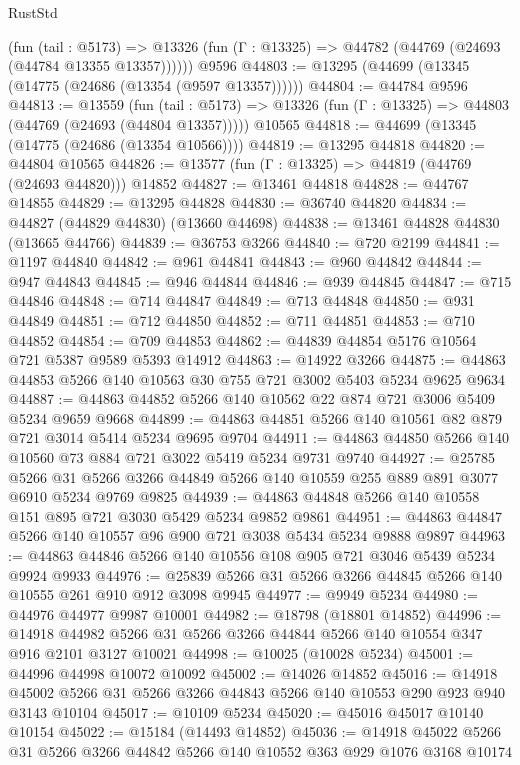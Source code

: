 \begin{lexlean}{RustStd}
\begin{coremodule}
      (fun (tail : @5173) =>
      @13326 (fun (Γ : @13325) => @44782 (@44769 (@24693 (@44784 @13355 @13357))))))
    @9596
@44803 := @13295 (@44699 (@13345 (@14775 (@24686 (@13354 (@9597 @13357))))))
@44804 := @44784 @9596
@44813 := @13559
    (fun (tail : @5173) => @13326 (fun (Γ : @13325) => @44803 (@44769 (@24693 (@44804 @13357)))))
    @10565
@44818 := @44699 (@13345 (@14775 (@24686 (@13354 @10566))))
@44819 := @13295 @44818
@44820 := @44804 @10565
@44826 := @13577 (fun (Γ : @13325) => @44819 (@44769 (@24693 @44820))) @14852
@44827 := @13461 @44818
@44828 := @44767 @14855
@44829 := @13295 @44828
@44830 := @36740 @44820
@44834 := @44827 (@44829 @44830) (@13660 @44698)
@44838 := @13461 @44828 @44830 (@13665 @44766)
@44839 := @36753 @3266
@44840 := @720 @2199
@44841 := @1197 @44840
@44842 := @961 @44841
@44843 := @960 @44842
@44844 := @947 @44843
@44845 := @946 @44844
@44846 := @939 @44845
@44847 := @715 @44846
@44848 := @714 @44847
@44849 := @713 @44848
@44850 := @931 @44849
@44851 := @712 @44850
@44852 := @711 @44851
@44853 := @710 @44852
@44854 := @709 @44853
@44862 := @44839 @44854 @5176 @10564 @721 @5387 @9589 @5393 @14912
@44863 := @14922 @3266
@44875 := @44863 @44853 @5266 @140 @10563 @30 @755 @721 @3002 @5403 @5234 @9625 @9634
@44887 := @44863 @44852 @5266 @140 @10562 @22 @874 @721 @3006 @5409 @5234 @9659 @9668
@44899 := @44863 @44851 @5266 @140 @10561 @82 @879 @721 @3014 @5414 @5234 @9695 @9704
@44911 := @44863 @44850 @5266 @140 @10560 @73 @884 @721 @3022 @5419 @5234 @9731 @9740
@44927 := @25785
    @5266
    @31
    @5266
    @3266
    @44849
    @5266
    @140
    @10559
    @255
    @889
    @891
    @3077
    @6910
    @5234
    @9769
    @9825
@44939 := @44863 @44848 @5266 @140 @10558 @151 @895 @721 @3030 @5429 @5234 @9852 @9861
@44951 := @44863 @44847 @5266 @140 @10557 @96 @900 @721 @3038 @5434 @5234 @9888 @9897
@44963 := @44863 @44846 @5266 @140 @10556 @108 @905 @721 @3046 @5439 @5234 @9924 @9933
@44976 := @25839 @5266 @31 @5266 @3266 @44845 @5266 @140 @10555 @261 @910 @912 @3098 @9945
@44977 := @9949 @5234
@44980 := @44976 @44977 @9987 @10001
@44982 := @18798 (@18801 @14852)
@44996 := @14918 @44982 @5266 @31 @5266 @3266 @44844 @5266 @140 @10554 @347 @916 @2101 @3127 @10021
@44998 := @10025 (@10028 @5234)
@45001 := @44996 @44998 @10072 @10092
@45002 := @14026 @14852
@45016 := @14918 @45002 @5266 @31 @5266 @3266 @44843 @5266 @140 @10553 @290 @923 @940 @3143 @10104
@45017 := @10109 @5234
@45020 := @45016 @45017 @10140 @10154
@45022 := @15184 (@14493 @14852)
@45036 := @14918 @45022 @5266 @31 @5266 @3266 @44842 @5266 @140 @10552 @363 @929 @1076 @3168 @10174

\end{coremodule}
\end{lexlean}
